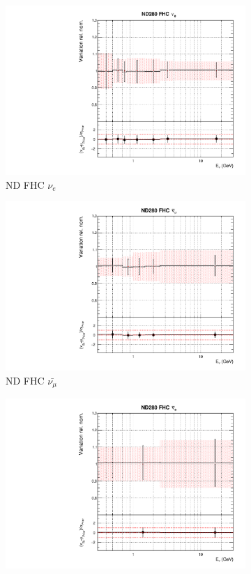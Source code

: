 \begin{figure}
\begin{subfigure}{0.24\textwidth}
  \includegraphics[width=0.95\linewidth]{figs/asmvflux1}
  \caption{ND FHC $\nu_e$}
  \label{fig:}
\end{subfigure}
\begin{subfigure}{0.24\textwidth}
  \centering
  \includegraphics[width=0.95\linewidth]{figs/asmvflux2}
  \caption{ND FHC $\bar{\nu_{\mu}}$}
  \label{fig:}
\end{subfigure}
\begin{subfigure}{0.24\textwidth}
  \centering
  \includegraphics[width=0.95\linewidth]{figs/asmvflux3}

\end{subfigure}
\end{figure}
